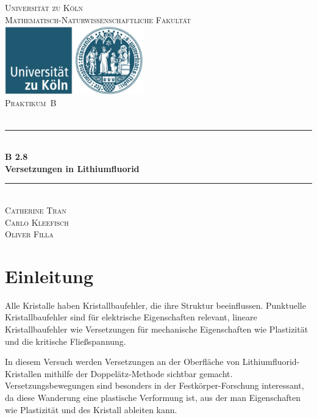 \documentclass[12pt,a4paper]{scrartcl}
\numberwithin{equation}{section} %
\newcommand{\HRule}{\rule{\linewidth}{0.7mm}}
\begin{document}
\begin{titlepage}
	\pagestyle{empty}

	\begin{center}

	\textsc{\LARGE Universität zu Köln }\\ [0.4cm]
	\textsc{Mathematisch-Naturwissenschaftliche Fakultät} \\[1.5cm]

	\includegraphics[width=0.45\textwidth]{../media/uni.jpg}\\[1.5cm]  %

	\textsc{\Large Praktikum~B}\\[2mm]
	\textsc{}\\[10mm]
	\HRule \\[0.4cm]

		{	\Huge \bfseries B 2.8}\\[0.4cm]
			{	\huge \bfseries Versetzungen in Lithiumfluorid}\\[0.3cm]
	
	\HRule \\[3cm]

		\textsc{\Large Catherine Tran } \\[3pt]
		\textsc{\Large Carlo Kleefisch } \\[3pt]
		\textsc{\Large Oliver Filla } \\[3pt]
	\end{center}
\end{titlepage}

\newpage
\tableofcontents
\newpage

\hypertarget{einleitung}{%
\section{Einleitung}\label{einleitung}}

Alle Kristalle haben Kristallbaufehler, die ihre Struktur beeinflussen.
Punktuelle Kristallbaufehler sind für elektrische Eigenschaften
relevant, lineare Kristallbaufehler wie Versetzungen für mechanische
Eigenschaften wie Plastizität und die kritische Fließspannung.

In diesem Versuch werden Versetzungen an der Oberfläche von
Lithiumfluorid-Kristallen mithilfe der Doppelätz-Methode sichtbar
gemacht. Versetzungsbewegungen sind besonders in der
Festkörper-Forschung interessant, da diese Wanderung eine plastische
Verformung ist, aus der man Eigenschaften wie Plastizität und des
Kristall ableiten kann.
\end{document}
